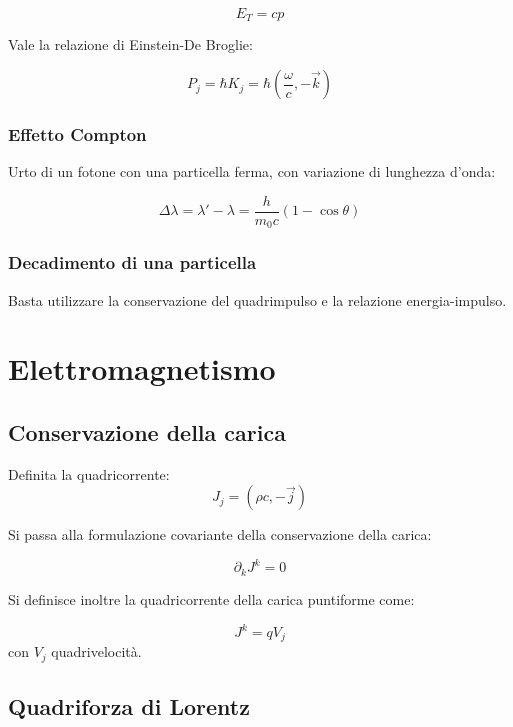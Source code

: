 \documentclass{article}
\begin{document}
\begin{equation}
    E_T=cp
\end{equation}

Vale la relazione di Einstein-De Broglie:

\begin{equation}
    P_j=\hbar K_j=\hbar (\frac{\omega}{c},-\vec{k})
\end{equation}

\subsubsection{Effetto Compton}
Urto di un fotone con una particella ferma, con variazione di lunghezza d'onda:

\begin{equation}
    \Delta \lambda = \lambda' - \lambda = \frac{h}{m_0c}(1-\cos \theta)
\end{equation}

\subsubsection{Decadimento di una particella}

Basta utilizzare la conservazione del quadrimpulso e la relazione energia-impulso.

\section{Elettromagnetismo}

\subsection{Conservazione della carica}
Definita la quadricorrente:
\begin{equation}
    J_j=(\rho c, -\vec{j})
\end{equation}

Si passa alla formulazione covariante della conservazione della carica:

\begin{equation}
    \partial _k J^k=0
\end{equation}

Si definisce inoltre la quadricorrente della carica puntiforme come:

\begin{equation}
    J^k=qV_j
\end{equation}
con $V_j$ quadrivelocità.

\subsection*{Quadriforza di Lorentz}
\end{document}
